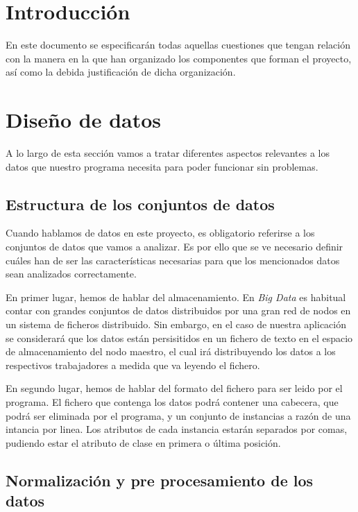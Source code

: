 
\section{Introducción}

En este documento se especificarán todas aquellas cuestiones que tengan relación con la manera en la que han organizado los componentes que forman el proyecto, así como la debida justificación de dicha organización.

\section{Diseño de datos}

A lo largo de esta sección vamos a tratar diferentes aspectos relevantes a los datos que nuestro programa necesita para poder funcionar sin problemas.

\subsection{Estructura de los conjuntos de datos}

Cuando hablamos de datos en este proyecto, es obligatorio referirse a los conjuntos de datos que vamos a analizar. Es por ello que se ve necesario definir cuáles han de ser las características necesarias para que los mencionados datos sean analizados correctamente.

En primer lugar, hemos de hablar del almacenamiento. En \textit{Big Data} es habitual contar con grandes conjuntos de datos distribuidos por una gran red de nodos en un sistema de ficheros distribuido. Sin embargo, en el caso de nuestra aplicación se considerará que los datos están persisitidos en un fichero de texto en el espacio de almacenamiento del nodo maestro, el cual irá distribuyendo los datos a los respectivos trabajadores a medida que va leyendo el fichero.

En segundo lugar, hemos de hablar del formato del fichero para ser leido por el programa. El fichero que contenga los datos podrá contener una cabecera, que podrá ser eliminada por el programa, y un conjunto de instancias a razón de una intancia por linea. Los atributos de cada instancia estarán separados por comas, pudiendo estar el atributo de clase en primera o última posición.

\subsection{Normalización y pre procesamiento de los datos}

